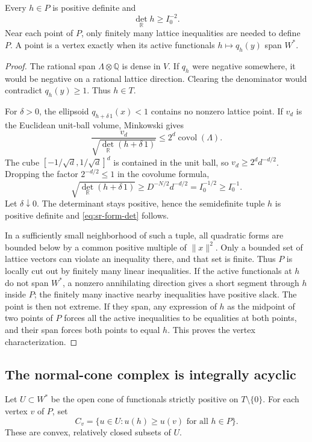 \begin{srlemma}\label{lem:sr-form-region}
Every \(h\in P\) is positive definite and
\begin{equation}\label{eq:sr-form-det}
                       \det_{\mathbb R}h\geq I_0^{-2}.
\end{equation}
Near each point of \(P\), only finitely many lattice inequalities
are needed to define \(P\). A point is a vertex exactly when its
active functionals \(h\mapsto q_h(y)\) span \(W^*\).
\end{srlemma}
\begin{proof}
The rational span \(\Lambda\otimes\mathbb Q\) is dense in \(V\).
If \(q_h\) were negative somewhere, it would be negative on a rational
lattice direction. Clearing the denominator would contradict
\(q_h(y)\geq1\). Thus \(h\in T\).

For \(\delta>0\), the ellipsoid
\(q_{h+\delta\,1}(x)<1\) contains no nonzero lattice point.
If \(v_d\) is the Euclidean unit-ball volume, Minkowski gives
\[
 \frac{v_d}{\sqrt{\det_{\mathbb R}(h+\delta\,1)}}
                      \leq2^d\operatorname{covol}(\Lambda).
\]
The cube \([-1/\sqrt d,1/\sqrt d]^d\) is contained in the unit
ball, so \(v_d\geq2^dd^{-d/2}\).
Dropping the factor \(2^{-d/2}\leq1\) in the covolume formula,
\[
 \sqrt{\det_{\mathbb R}(h+\delta\,1)}
       \geq D^{-N/2}d^{-d/2}=I_0^{-1/2}\geq I_0^{-1}.
\]
Let \(\delta\downarrow0\). The determinant stays positive, hence
the semidefinite tuple \(h\) is positive definite and
\eqref{eq:sr-form-det} follows.

In a sufficiently small neighborhood of such a tuple, all quadratic
forms are bounded below by a common positive multiple of \(\|x\|^2\).
Only a bounded set of lattice vectors can violate an inequality
there, and that set is finite.
Thus \(P\) is locally cut out by finitely many linear inequalities.
If the active functionals at \(h\) do not span \(W^*\), a nonzero
annihilating direction gives a short segment through \(h\) inside
\(P\); the finitely many inactive nearby inequalities have positive
slack. The point is then not extreme.
If they span, any expression of \(h\) as the midpoint of two points
of \(P\) forces all the active inequalities to be equalities at both
points, and their span forces both points to equal \(h\).
This proves the vertex characterization.
\end{proof}

\subsection{The normal-cone complex is integrally acyclic}
Let \(U\subset W^*\) be the open cone of functionals strictly positive
on \(T\setminus\{0\}\).
For each vertex \(v\) of \(P\), set
\[
 C_v=\{u\in U:u(h)\geq u(v)\text{ for all }h\in P\}.
\]
These are convex, relatively closed subsets of \(U\).

